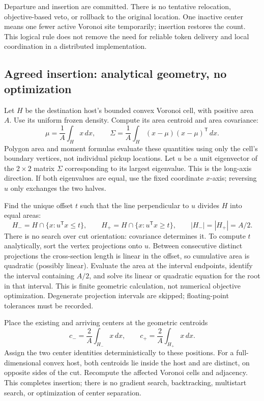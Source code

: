 \documentclass[11pt]{article}
\begin{document}
Departure and insertion are committed. There is no tentative relocation,
objective-based veto, or rollback to the original location. One inactive center
means one fewer active Voronoi site temporarily; insertion restores the count.
This logical rule does not remove the need for reliable token delivery and
local coordination in a distributed implementation.

\subsection{Agreed insertion: analytical geometry, no optimization}
Let $H$ be the destination host's bounded convex Voronoi cell, with positive
area $A$. Use its uniform frozen density. Compute its area centroid and
area covariance:
\[
 \mu=\frac{1}{A}\int_H x\,dx,\qquad
 \Sigma=\frac{1}{A}\int_H (x-\mu)(x-\mu)^{\mathsf T}\,dx.
\]
Polygon area and moment formulas evaluate these quantities using only the
cell's boundary vertices, not individual pickup locations. Let $u$ be a unit
eigenvector of the $2\times2$ matrix $\Sigma$ corresponding to its largest
eigenvalue. This is the long-axis direction. If both eigenvalues are equal,
use the fixed coordinate $x$-axis; reversing $u$ only exchanges the two halves.

Find the unique offset $t$ such that the line perpendicular to $u$ divides
$H$ into equal areas:
\[
 H_- = H\cap\{x:u^{\mathsf T}x\leq t\},\qquad
 H_+ = H\cap\{x:u^{\mathsf T}x\geq t\},\qquad
 |H_-|=|H_+|=A/2.
\]
There is no search over cut orientation: covariance determines it. To compute
$t$ analytically, sort the vertex projections onto $u$. Between consecutive
distinct projections the cross-section length is linear in the offset, so
cumulative area is quadratic (possibly linear). Evaluate the area at the
interval endpoints, identify the interval containing $A/2$, and solve its
linear or quadratic equation for the root in that interval. This is finite
geometric calculation, not numerical objective optimization. Degenerate
projection intervals are skipped; floating-point tolerances must be recorded.

Place the existing and arriving centers at the geometric centroids
\[
 c_- = \frac{2}{A}\int_{H_-}x\,dx,\qquad
 c_+ = \frac{2}{A}\int_{H_+}x\,dx.
\]
Assign the two center identities deterministically to these positions. For a
full-dimensional convex host, both centroids lie inside the host and are
distinct, on opposite sides of the cut. Recompute the affected Voronoi cells
and adjacency. This completes insertion; there is no gradient search,
backtracking, multistart search, or optimization of center separation.
\end{document}

